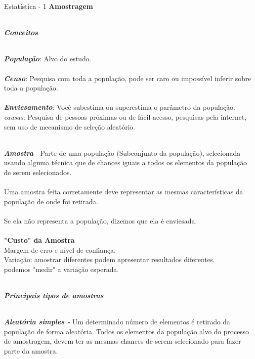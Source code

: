 \documentclass[12pt,a4paper]{article}
\begin{document}
	
{\LARGE Estatística - 1}
\newline
\newline
\textbf{{\large Amostragem}}

\textbf{\textit{\\Conceitos}} 

\textbf{\textit{\\População}}: Alvo do estudo.
\textbf{\textit{\\\\Censo}}: Pesquisa com toda a população, pode ser caro ou impossível inferir sobre toda a população.
\textbf{\textit{\\\\Enviesamento}}: Você subestima ou superestima o parâmetro da população. 
\textit{causas}: Pesquisa de pessoas próximas ou de fácil acesso, pesquisas pela internet, sem uso de mecanismo de seleção aleatório.

\textbf{\textit{\\Amostra}} - Parte de uma população (Subconjunto da população), selecionada usando alguma técnica que de chances iguais a todos os elementos da população de serem selecionados. 
\\\\Uma amostra feita corretamente deve representar as mesmas características da população de onde foi retirada.
\\\\Se ela não representa a população, dizemos que ela é enviesada.
\textbf{\\\\"Custo" da Amostra}
\\Margem de erro e nível de confiança.
\\Variação: amostrar diferentes podem apresentar resultados diferentes.
\\podemos "medir" a variação esperada.

\newpage

\textbf{\textit{\\Principais tipos de amostras}} 

\textbf{\textit{\\Aleatória simples - }}
Um determinado número de elementos é retirado da população de forma aleatória.
Todos os elementos da população alvo do processo de amostragem, devem ter as mesmas chances 
de serem selecionado para fazer parte da amostra.
\end{document}
